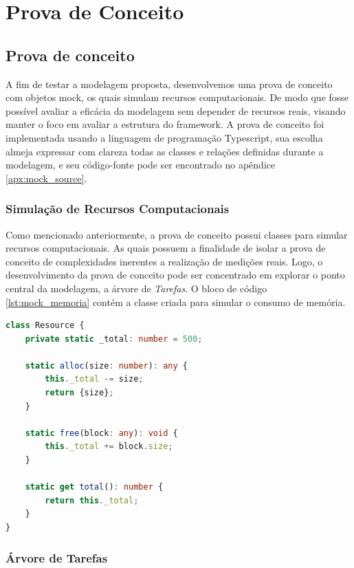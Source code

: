 \documentclass[12pt]{tcc}
\begin{document}
\appendix
\chapter{Prova de Conceito}
\label{apx:mock}

\section{Prova de conceito}
\label{cap:prova_de_conceito}

A fim de testar a modelagem proposta, desenvolvemos uma prova de conceito com objetos mock, os quais simulam recursos computacionais.
De modo que fosse possível avaliar a eficácia da modelagem sem depender de recursos reais, visando manter o foco em avaliar a estrutura do framework.
A prova de conceito foi implementada usando a linguagem de programação Typescript, sua escolha almeja expressar com clareza todas as classes e relações definidas durante a modelagem, e seu código-fonte pode ser encontrado no apêndice \ref{apx:mock_source}.


\subsection{Simulação de Recursos Computacionais}
Como mencionado anteriormente, a prova de conceito possui classes para simular recursos computacionais.
As quais possuem a finalidade de isolar a prova de conceito de complexidades inerentes a realização de medições reais.
Logo, o desenvolvimento da prova de conceito pode ser concentrado em explorar o ponto central da modelagem, a árvore de \emph{Tarefas}.
O bloco de código \ref{lst:mock_memoria} contém a classe criada para simular o consumo de memória.

\begin{lstlisting}[label={lst:mock_memoria}, caption={Implementação da classe responsável por simular recursos de memória para a prova de conceito do framework.}, language=TypeScript]
class Resource {
	private static _total: number = 500;

	static alloc(size: number): any {
		this._total -= size;
		return {size};
	}

	static free(block: any): void {
		this._total += block.size;
	}

	static get total(): number {
		return this._total;
	}
}
\end{lstlisting}


\subsection{Árvore de Tarefas}
\end{document}
